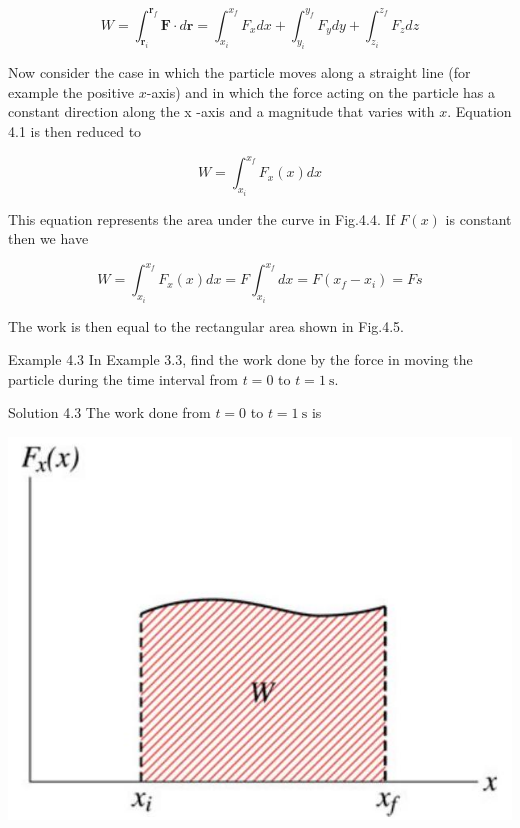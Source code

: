 \documentclass[10pt]{article}
\begin{document}
\begin{equation*}
W=\int_{\mathbf{r}_{i}}^{\mathbf{r}_{f}} \mathbf{F} \cdot d \mathbf{r}=\int_{x_{i}}^{x_{f}} F_{x} d x+\int_{y_{i}}^{y_{f}} F_{y} d y+\int_{z_{i}}^{z_{f}} F_{z} d z \tag{4.1}
\end{equation*}


Now consider the case in which the particle moves along a straight line (for example the positive $x$-axis) and in which the force acting on the particle has a constant direction along the x -axis and a magnitude that varies with $x$. Equation 4.1 is then reduced to


\begin{equation*}
W=\int_{x_{i}}^{x_{f}} F_{x}(x) d x \tag{4.2}
\end{equation*}


This equation represents the area under the curve in Fig.4.4. If $F(x)$ is constant then we have

$$
W=\int_{x_{i}}^{x_{f}} F_{x}(x) d x=F \int_{x_{i}}^{x_{f}} d x=F\left(x_{f}-x_{i}\right)=F s
$$

The work is then equal to the rectangular area shown in Fig.4.5.

Example 4.3 In Example 3.3, find the work done by the force in moving the particle during the time interval from $t=0$ to $t=1 \mathrm{~s}$.

Solution 4.3 The work done from $t=0$ to $t=1 \mathrm{~s}$ is

\begin{center}
\includegraphics[max width=\textwidth]{2024_09_13_db1f357d2aad0a03eb2eg-064}
\end{center}
\end{document}
